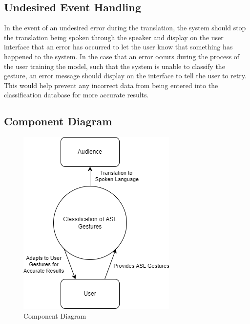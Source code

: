 \documentclass[12pt, titlepage]{article}
\begin{document}
\subsection{Undesired Event Handling}
In the event of an undesired error during the translation, the system should stop the translation being spoken through the speaker and display on the 
user interface that an error has occurred to let the user know that something has happened to the system. In the case that an error occurs during the 
process of the user training the model, such that the system is unable to classify the gesture, an error message should display on the interface to 
tell the user to retry. This would help prevent any incorrect data from being entered into the classification database for more accurate results.

\subsection{Component Diagram}

\begin{figure}[H] 
\centering
\includegraphics[width=\textwidth,height=0.88\textheight,keepaspectratio]{ComponentDiagram.jpg} 
\caption{Component Diagram} 
\label{Fig.Component_Diagram} 
\end{figure}
\end{document}
